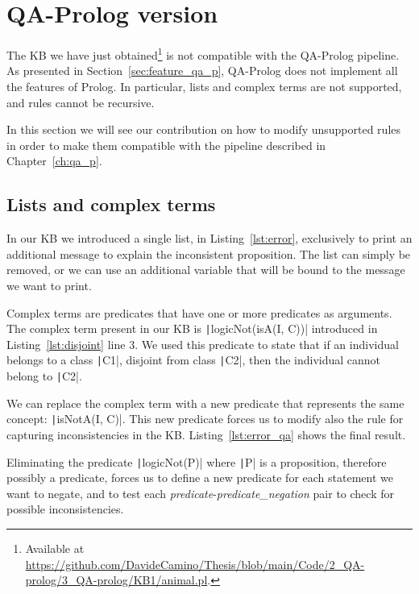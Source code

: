 \section{QA-Prolog version}
The KB we have just obtained\footnote{Available at \url{https://github.com/DavideCamino/Thesis/blob/main/Code/2_QA-prolog/3_QA-prolog/KB1/animal.pl}.} is not compatible with the QA-Prolog pipeline. As presented in Section~\ref{sec:feature_qa_p}, QA-Prolog does not implement all the features of Prolog. In particular, lists and complex terms are not supported, and rules cannot be recursive.

In this section we will see our contribution on how to modify unsupported rules in order to make them compatible with the pipeline described in Chapter~\ref{ch:qa_p}.

\subsection{Lists and complex terms}
In our KB we introduced a single list, in Listing~\ref{lst:error}, exclusively to print an additional message to explain the inconsistent proposition. The list can simply be removed, or we can use an additional variable that will be bound to the message we want to print.

Complex terms are predicates that have one or more predicates as arguments. The complex term present in our KB is \texttt|logicNot(isA(I, C))| introduced in Listing~\ref{lst:disjoint} line $3$. We used this predicate to state that if an individual belongs to a class \texttt|C1|, disjoint from class \texttt|C2|, then the individual cannot belong to \texttt|C2|. 

We can replace the complex term with a new predicate that represents the same concept: \texttt|isNotA(I, C)|. This new predicate forces us to modify also the rule for capturing inconsistencies in the KB. Listing~\ref{lst:error_qa} shows the final result.

\begin{listingenv}[h]
	\caption{List and complex term removal}
	\label{lst:error_qa}
\end{listingenv}

Eliminating the predicate \texttt|logicNot(P)| where \texttt|P| is a proposition, therefore possibly a predicate, forces us to define a new predicate for each statement we want to negate, and to test each \emph{predicate}-\emph{predicate\_negation} pair to check for possible inconsistencies.

